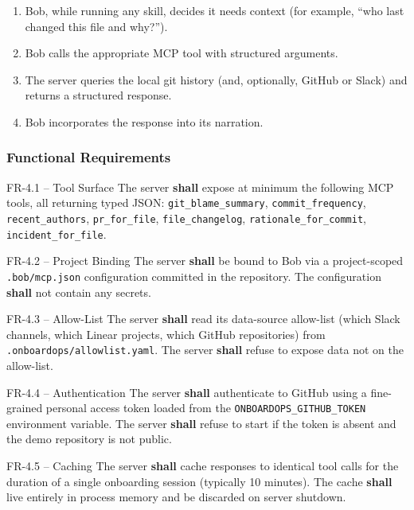 \documentclass[11pt,letterpaper]{article}
\newcommand{\shall}{\textbf{shall}}
\begin{document}
\begin{enumerate}
  \item Bob, while running any skill, decides it needs context (for example, ``who last changed this file and why?'').
  \item Bob calls the appropriate MCP tool with structured arguments.
  \item The server queries the local git history (and, optionally, GitHub or Slack) and returns a structured response.
  \item Bob incorporates the response into its narration.
\end{enumerate}

\subsubsection{Functional Requirements}

\begin{reqbox}{FR-4.1 -- Tool Surface}
The server \shall{} expose at minimum the following MCP tools, all returning typed JSON: \texttt{git\_blame\_summary}, \texttt{commit\_frequency}, \texttt{recent\_authors}, \texttt{pr\_for\_file}, \texttt{file\_changelog}, \texttt{rationale\_for\_commit}, \texttt{incident\_for\_file}.
\end{reqbox}

\begin{reqbox}{FR-4.2 -- Project Binding}
The server \shall{} be bound to Bob via a project-scoped \texttt{.bob/mcp.json} configuration committed in the repository. The configuration \shall{} not contain any secrets.
\end{reqbox}

\begin{reqbox}{FR-4.3 -- Allow-List}
The server \shall{} read its data-source allow-list (which Slack channels, which Linear projects, which GitHub repositories) from \texttt{.onboardops/allowlist.yaml}. The server \shall{} refuse to expose data not on the allow-list.
\end{reqbox}

\begin{reqbox}{FR-4.4 -- Authentication}
The server \shall{} authenticate to GitHub using a fine-grained personal access token loaded from the \texttt{ONBOARDOPS\_GITHUB\_TOKEN} environment variable. The server \shall{} refuse to start if the token is absent and the demo repository is not public.
\end{reqbox}

\begin{reqbox}{FR-4.5 -- Caching}
The server \shall{} cache responses to identical tool calls for the duration of a single onboarding session (typically 10 minutes). The cache \shall{} live entirely in process memory and be discarded on server shutdown.
\end{reqbox}
\end{document}
